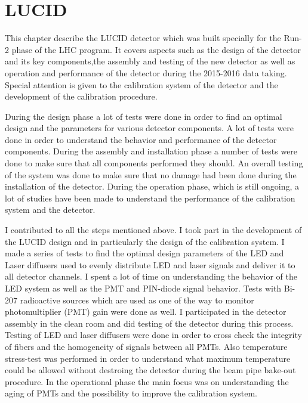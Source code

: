 \chapter{LUCID}
\label{chap:LUCID}


This chapter describe the LUCID detector which was built specially for the Run-2 phase of the LHC program.
It covers aspects such as the design of the detector and its key components,the assembly and testing of the new detector as well as
operation and performance of the detector during the 2015-2016 data taking.
Special attention is given to the calibration system of the detector and the development of the calibration procedure.

During the design phase a lot of tests were done in order to find an optimal design and the parameters for various detector components.
A lot of tests were done in order to understand the behavior and performance of the detector components.
During the assembly and installation phase a number of tests were done to make sure that all components performed they should.
An overall testing of the system was done to make sure that no damage had been done during the installation of the detector.
During the operation phase, which is still ongoing, a lot of studies have been made to understand the performance of the calibration system and the detector.

I contributed to all the steps mentioned above. I took part in the development of the LUCID design and in particularly the design of the calibration system. 
I made a series of tests to find the optimal design parameters of the LED and Laser diffusers used to evenly distribute LED and laser signals and deliver it to all detector 
channels. 
I spent a lot of time on understanding the behavior of the LED system as well as the PMT and PIN-diode signal behavior.
Tests with Bi-207 radioactive sources which are used as one of the way to monitor photomultiplier (PMT) gain were done as well.
I participated in the detector assembly in the clean room and did testing of the detector during this process.
Testing of LED and laser diffusers were done in order to cross check the integrity of fibers and the homogeneity of signals between all PMTs.
Also temperature stress-test was performed in order to understand what maximum temperature could be allowed without destroing the detector during the 
beam pipe bake-out procedure.
In the operational phase the main focus was on understanding the aging of PMTs and the possibility to improve the calibration system.

